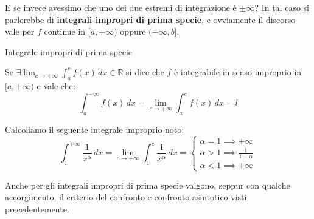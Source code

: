 \documentclass[12pt]{report}
\newcommand{\R}{\mathbb{R}}
\begin{document}
	E se invece avessimo che uno dei due estremi di integrazione è $\pm\infty$?
	In tal caso si parlerebbe di \textbf{integrali impropri di prima specie}, e ovviamente il discorso vale per $f$ continue in $[a, +\infty)$ oppure $(-\infty, b]$.
	
	\begin{definizione}{Integrale impropri di prima specie}{}
		
		Se $\exists \lim_{c \to +\infty} \int_{a}^{c} f(x) \, dx \in \R$ si dice che $f$ è integrabile in senso improprio in $[a, +\infty)$ e vale che:
		\[
		\int_{a}^{+\infty} f(x) \, dx = \lim_{c \to +\infty} \int_{a}^{c} f(x) \, dx = l
		\]
		
	\end{definizione}
	
	\begin{osservazione}{}{}
		Calcoliamo il seguente integrale improprio noto:
		\[
		\int_{1}^{+\infty} \frac{1}{x^\alpha} \, dx = \lim_{c \to +\infty} \int_{1}^{c} \frac{1}{x^\alpha} \, dx = 
		\begin{cases}
			\alpha = 1 \implies +\infty \\
			\alpha > 1 \implies \frac{1}{1-\alpha}\\
			\alpha < 1 \implies +\infty
		\end{cases}
		\]
		
	\end{osservazione}
	
	Anche per gli integrali impropri di prima specie valgono, seppur con qualche accorgimento, il criterio del confronto e confronto asintotico visti precedentemente.
	
\end{document}
